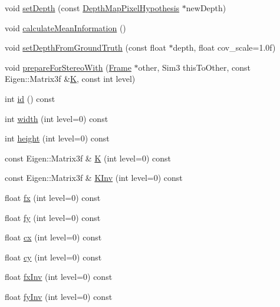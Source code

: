 \begin{DoxyCompactItemize}
\item 
void \hyperlink{classlsd__slam_1_1_frame_aa869fc645781090678dc61399ef26f73}{set\-Depth} (const \hyperlink{classlsd__slam_1_1_depth_map_pixel_hypothesis}{Depth\-Map\-Pixel\-Hypothesis} $\ast$new\-Depth)
\item 
void \hyperlink{classlsd__slam_1_1_frame_a4ff87802d5bcafda551ffb2506f7192e}{calculate\-Mean\-Information} ()
\item 
void \hyperlink{classlsd__slam_1_1_frame_a7e563deb5eadcaddc85d7618bb021b1b}{set\-Depth\-From\-Ground\-Truth} (const float $\ast$depth, float cov\-\_\-scale=1.\-0f)
\item 
void \hyperlink{classlsd__slam_1_1_frame_a377c85038536721d99473f810cb45241}{prepare\-For\-Stereo\-With} (\hyperlink{classlsd__slam_1_1_frame}{Frame} $\ast$other, Sim3 this\-To\-Other, const Eigen\-::\-Matrix3f \&\hyperlink{classlsd__slam_1_1_frame_adeb235dc3e4a4d8fcf622b5771299c31}{K}, const int level)
\item 
int \hyperlink{classlsd__slam_1_1_frame_a6d38d40cd9a68d253bcb3cab2ddfa068}{id} () const 
\item 
int \hyperlink{classlsd__slam_1_1_frame_a3f14a1c43b6cb21d31274f880b0bf36b}{width} (int level=0) const 
\item 
int \hyperlink{classlsd__slam_1_1_frame_a014d19bf6ffba0f0c0b8b684f9afb0b0}{height} (int level=0) const 
\item 
const Eigen\-::\-Matrix3f \& \hyperlink{classlsd__slam_1_1_frame_adeb235dc3e4a4d8fcf622b5771299c31}{K} (int level=0) const 
\item 
const Eigen\-::\-Matrix3f \& \hyperlink{classlsd__slam_1_1_frame_af32c050a1ada7d6c22aa8df04fd94085}{K\-Inv} (int level=0) const 
\item 
float \hyperlink{classlsd__slam_1_1_frame_aaa552f594a3e712b981762719d652359}{fx} (int level=0) const 
\item 
float \hyperlink{classlsd__slam_1_1_frame_af8a9e82339d7f20a380a47d27cdeb01e}{fy} (int level=0) const 
\item 
float \hyperlink{classlsd__slam_1_1_frame_a8d46588a32aa5feb71f771f267dc432d}{cx} (int level=0) const 
\item 
float \hyperlink{classlsd__slam_1_1_frame_a2732f1bad0442085b11f3552a2fd0525}{cy} (int level=0) const 
\item 
float \hyperlink{classlsd__slam_1_1_frame_a9d98889a6a367e862f28b4a035604f46}{fx\-Inv} (int level=0) const 
\item 
float \hyperlink{classlsd__slam_1_1_frame_ab5c98941622d0f0470381a8ed2f833c1}{fy\-Inv} (int level=0) const 

\end{DoxyCompactItemize}
